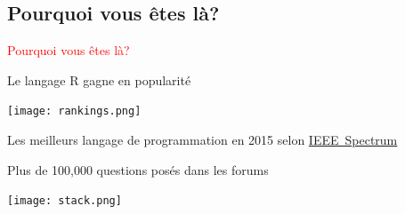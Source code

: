 \documentclass[11pt]{beamer}\usepackage[]{graphicx}\usepackage[]{color}
\begin{document}
\subsection{Pourquoi vous \^{e}tes l\`{a}?}

\begin{frame}
 \begin{center}
  \Huge{\textcolor{red}{Pourquoi vous \^{e}tes l\`{a}?}}
 \end{center}
\end{frame}


\begin{frame}{Le langage R gagne en popularit\'{e}}

\vspace{0.1in}

\begin{center}
\texttt{[image: rankings.png]}
\end{center}

\vspace{0.2in}

Les meilleurs langage de programmation en 2015 selon \href{http://spectrum.ieee.org/computing/software/the-2015-top-ten-programming-languages}{\mbox{IEEE Spectrum}} \\
\end{frame}


\begin{frame}{Plus de 100,000 questions pos\'{e}s dans les forums}

\texttt{[image: stack.png]}
\newline
\vspace{0.1in}
\end{frame}
\end{document}
